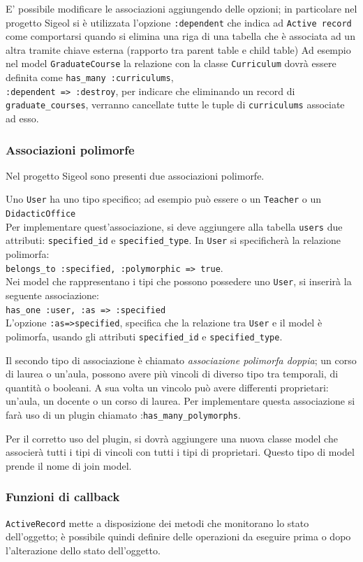 \documentclass[11pt,a4paper]{article}
\begin{document}
E' possibile modificare le associazioni aggiungendo delle opzioni; in particolare nel progetto Sigeol si è utilizzata l'opzione \verb|:dependent| che indica ad \verb|Active record| come comportarsi quando si elimina una riga di una tabella che è associata ad un altra tramite chiave esterna (rapporto tra parent table e child table)
Ad esempio nel model \verb|GraduateCourse| la relazione con la classe \verb|Curriculum| dovrà essere definita come \verb|has_many :curriculums|,\\ \verb|:dependent => :destroy|, per indicare che eliminando un record di \\ \verb|graduate_courses|, verranno cancellate tutte le tuple di \verb|curriculums| associate ad esso.
\subsubsection*{Associazioni polimorfe}
Nel progetto Sigeol sono presenti due associazioni polimorfe.

Uno \verb|User| ha uno tipo specifico; ad esempio può essere o un \verb|Teacher| o un \verb|DidacticOffice|\\
Per implementare quest'associazione, si deve aggiungere alla tabella \verb|users| due attributi: \verb|specified_id| e \verb|specified_type|.
In \verb|User| si specificherà la relazione polimorfa:\\
\verb|belongs_to :specified, :polymorphic => true|.\\
Nei model che rappresentano i tipi che possono possedere uno \verb|User|, si inserirà la seguente associazione:\\
\verb|has_one :user, :as => :specified|\\
L'opzione \verb|:as=>specified|, specifica che la relazione tra \verb|User| e il model è polimorfa, usando gli attributi \verb|specified_id| e \verb|specified_type|.

Il secondo tipo di associazione è chiamato \textit{associazione polimorfa doppia}; un corso di laurea o un'aula, possono avere più vincoli di diverso tipo tra temporali, di quantità o booleani. A sua volta un vincolo può avere differenti proprietari: un'aula, un docente o un corso di laurea.
Per implementare questa associazione si farà uso di un plugin chiamato :\verb|has_many_polymorphs|. 

Per il corretto uso del plugin, si dovrà aggiungere una nuova classe model che associerà tutti i tipi di vincoli con tutti i tipi di proprietari. Questo tipo di model prende il nome di join model.
\subsubsection*{Funzioni di callback}
\verb|ActiveRecord| mette a disposizione dei metodi che monitorano lo stato dell'oggetto; è possibile quindi definire delle operazioni da eseguire prima o dopo l'alterazione dello stato dell'oggetto.
\end{document}

